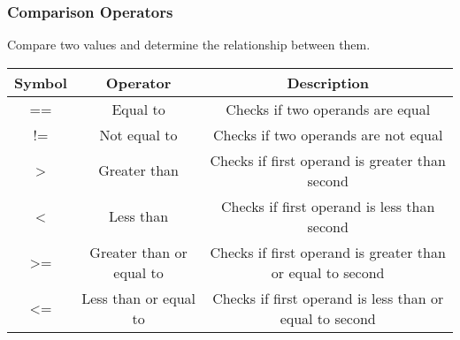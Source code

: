 \documentclass[11pt,A4]{article}
\begin{document}
            \subsubsection{Comparison Operators}
            Compare two values and determine the relationship between them.
            \begin{table}[h]
                \centering
                \setlength{\arrayrulewidth}{0.3mm}
                \renewcommand{\arraystretch}{1.2}
                \begin{tabular}{ccc}
                    \toprule
                    Symbol & Operator & Description \\
                    \midrule
                    == & Equal to & Checks if two operands are equal \\
                    \arrayrulecolor{gray!50}\cmidrule(lr){1-3}\arrayrulecolor{black}
                    != & Not equal to & Checks if two operands are not equal \\
                    \arrayrulecolor{gray!50}\cmidrule(lr){1-3}\arrayrulecolor{black}
                    > & Greater than & Checks if first operand is greater than second \\
                    \arrayrulecolor{gray!50}\cmidrule(lr){1-3}\arrayrulecolor{black}
                    < & Less than & Checks if first operand is less than second \\
                    \arrayrulecolor{gray!50}\cmidrule(lr){1-3}\arrayrulecolor{black}
                    >= & Greater than or equal to & Checks if first operand is greater than or equal to second \\
                    \arrayrulecolor{gray!50}\cmidrule(lr){1-3}\arrayrulecolor{black}
                    <= & Less than or equal to & Checks if first operand is less than or equal to second \\
                    \bottomrule
                \end{tabular}
            \end{table}  
                        
\end{document}
